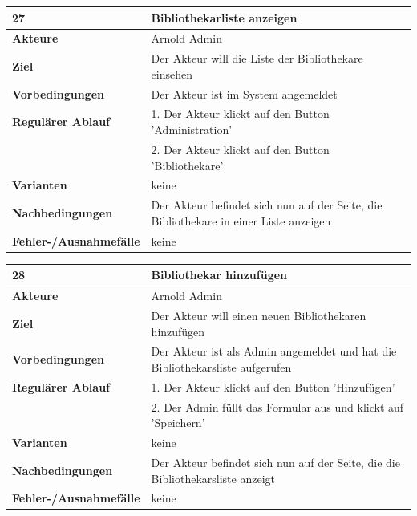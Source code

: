 \documentclass[fontsize=12pt,paper=a4,twoside]{scrartcl}
\begin{document}
\begin{table}[htbp]
\label{27}
\begin{tabular}{|l|p{10cm}|}
\hline 
\textbf{27} & \textbf{Bibliothekarliste anzeigen} \\ \hline
\textbf{Akteure} & Arnold Admin\\ \hline
\textbf{Ziel} & Der Akteur will die Liste der Bibliothekare einsehen \\ \hline
\textbf{Vorbedingungen} & Der Akteur ist im System angemeldet \\ \hline
\textbf{Regulärer Ablauf} & 
1. Der Akteur klickt auf den Button 'Administration' \\
&2. Der Akteur klickt auf den Button 'Bibliothekare'\\
\hline
\textbf{Varianten} & 
keine \\ \hline
\textbf{Nachbedingungen} & Der Akteur befindet sich nun auf der Seite, die Bibliothekare in einer 
Liste anzeigen\\ \hline
\textbf{Fehler-/Ausnahmefälle} & keine\\
\hline
\end{tabular}
\end{table}

\begin{table}[htbp]
\label{28}
\begin{tabular}{|l|p{10cm}|}
\hline 
\textbf{28} & \textbf{Bibliothekar hinzufügen} \\ \hline
\textbf{Akteure} & Arnold Admin\\ \hline
\textbf{Ziel} & Der Akteur will einen neuen Bibliothekaren hinzufügen \\ \hline
\textbf{Vorbedingungen} & Der Akteur ist als Admin angemeldet und hat die Bibliothekarsliste 
aufgerufen \\ \hline
\textbf{Regulärer Ablauf} & 
1. Der Akteur klickt auf den Button 'Hinzufügen' \\
&2. Der Admin füllt das Formular aus und klickt auf 'Speichern'\\
\hline
\textbf{Varianten} & 
keine \\ \hline
\textbf{Nachbedingungen} & Der Akteur befindet sich nun auf der Seite, die die Bibliothekarsliste 
anzeigt\\ \hline
\textbf{Fehler-/Ausnahmefälle} & keine\\
\hline
\end{tabular}
\end{table}
\end{document}
